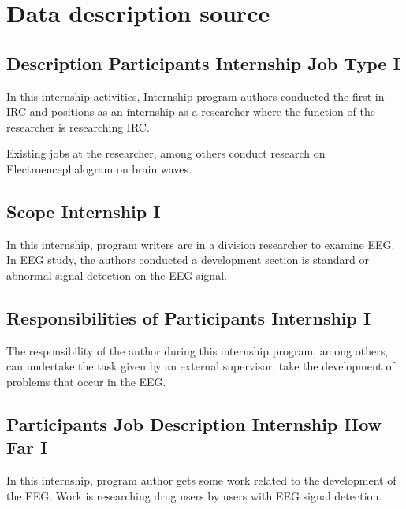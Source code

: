 \section{Data description source}
\subsection{Description Participants Internship Job Type I}
In this internship activities, Internship program authors conducted the first in IRC and positions as an internship as a researcher where the function of the researcher is researching IRC.
\par
Existing jobs at the researcher, among others conduct research on Electroencephalogram on brain waves.
\subsection{Scope Internship I}
In this internship, program writers are in a division researcher to examine EEG. In EEG study, the authors conducted a development section is standard or abnormal signal detection on the EEG signal.
\subsection{Responsibilities of Participants Internship I}
The responsibility of the author during this internship program, among others, can undertake the task given by an external supervisor, take the development of problems that occur in the EEG.
\subsection{Participants Job Description Internship How Far I}
In this internship, program author gets some work related to the development of the EEG. Work is researching drug users by users with EEG signal detection.

